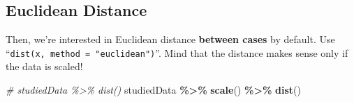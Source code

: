 \documentclass[
]{ctexart}
\newenvironment{Shaded}{\begin{snugshade}}{\end{snugshade}}
\newcommand{\CommentTok}[1]{\textcolor[rgb]{0.56,0.35,0.01}{\textit{#1}}}
\newcommand{\FunctionTok}[1]{\textcolor[rgb]{0.13,0.29,0.53}{\textbf{#1}}}
\newcommand{\NormalTok}[1]{#1}
\newcommand{\SpecialCharTok}[1]{\textcolor[rgb]{0.81,0.36,0.00}{\textbf{#1}}}
\begin{document}
\hypertarget{euclidean-distance}{%
\subsection{Euclidean Distance}\label{euclidean-distance}}

Then, we're interested in Euclidean distance \textbf{between cases} by
default. Use ``\texttt{dist(x,\ method\ =\ "euclidean")}''. Mind that
the distance makes sense only if the data is scaled!

\begin{Shaded}
\begin{Highlighting}[]
\CommentTok{\# studiedData \%\textgreater{}\% dist()}
\NormalTok{studiedData  }\SpecialCharTok{\%\textgreater{}\%} 
  \FunctionTok{scale}\NormalTok{() }\SpecialCharTok{\%\textgreater{}\%} \FunctionTok{dist}\NormalTok{() }
\end{Highlighting}
\end{Shaded}
\end{document}
